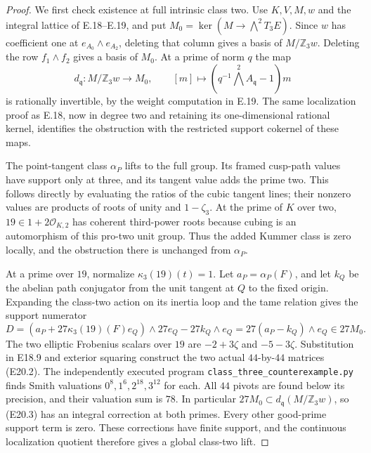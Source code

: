 \documentclass[11pt,oneside]{article}
\begin{document}
\begin{proof}
We first check existence at full intrinsic class
two. Use $K,V,M,w$ and the integral lattice of
E.18--E.19, and put $M_0=\ker(M\to\bigwedge^2T_3E)$.
Since $w$ has coefficient one at
$e_{A_0}\wedge e_{A_2}$, deleting that column gives
a basis of $M/\mathbb Z_3w$. Deleting the row
$f_1\wedge f_2$ gives a basis of $M_0$.
At a prime of norm $q$ the map
\[
 d_{\mathfrak q}:M/\mathbb Z_3w\longrightarrow M_0,
       \qquad [m]\longmapsto(q^{-1}\bigwedge^2A_{\mathfrak q}-1)m
 \tag{E20.2}
\]
is rationally invertible, by the weight computation
in E.19. The same localization proof as E.18,
now in degree two and retaining its one-dimensional
rational kernel, identifies the obstruction with
the restricted support cokernel of these maps.

The point-tangent class $\alpha_P$ lifts to the
full group. Its framed cusp-path values have
support only at three, and its tangent value
adds the prime two. This follows directly by
evaluating the ratios of the cubic tangent lines;
their nonzero values are products of roots of
unity and $1-\zeta_3$. At the prime of $K$ over
two, $19\in1+2\mathcal O_{K,2}$ has coherent
third-power roots because cubing is an automorphism
of this pro-two unit group. Thus the added
Kummer class is zero locally, and the obstruction
there is unchanged from $\alpha_P$.

At a prime over $19$, normalize
$\kappa_3(19)(t)=1$. Let $a_P=\alpha_P(F)$, and
let $k_Q$ be the abelian path conjugator from the
unit tangent at $Q$ to the fixed origin. Expanding
the class-two action on its inertia loop and the
tame relation gives the support numerator
\[
 D=(a_P+27\kappa_3(19)(F)e_Q)\wedge27e_Q
                   -27k_Q\wedge e_Q
       =27(a_P-k_Q)\wedge e_Q\in27M_0.
 \tag{E20.3}
\]
The two elliptic Frobenius scalars over $19$ are
$-2+3\zeta$ and $-5-3\zeta$. Substitution in
E18.9 and exterior squaring construct the two
actual $44$-by-$44$ matrices (E20.2).
The independently executed program
\texttt{class\_three\_counterexample.py} finds
Smith valuations $0^8,1^6,2^{18},3^{12}$ for each.
All $44$ pivots are found below its precision,
and their valuation sum is $78$. In particular
$27M_0\subset d_{\mathfrak q}(M/\mathbb Z_3w)$,
so (E20.3) has an integral correction at both
primes. Every other good-prime support term is
zero. These corrections have finite support,
and the continuous localization quotient
therefore gives a global class-two lift.


\end{proof}
\end{document}
